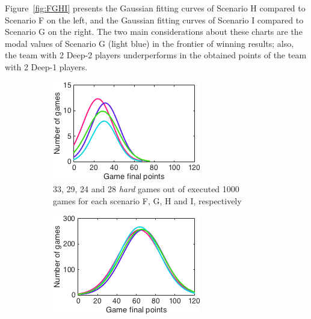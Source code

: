 Figure~\ref{fig:FGHI} presents the Gaussian fitting curves of Scenario H compared to Scenario F on the left, and the Gaussian fitting curves of Scenario I compared to Scenario G on the right.
The two main considerations about these charts are the modal values of Scenario G (light blue) in the frontier of winning results; also, the team with 2 Deep-2 players underperforms in the obtained points of the team with 2 Deep-1 players.

\begin{figure}[h]
        \centering
        \begin{subfigure}[h]{0.32\textwidth}
                \includegraphics[width=\textwidth]{./img/4/FGHIhard}
                \caption{33, 29, 24 and 28 \emph{hard} games out of executed 1000 games for each scenario F, G, H and I, respectively}
                \label{fig:FGHIhard}
        \end{subfigure}
        \begin{subfigure}[h]{0.32\textwidth}
                \includegraphics[width=\textwidth]{./img/4/FGHImedium}

\end{subfigure}
\end{figure}
